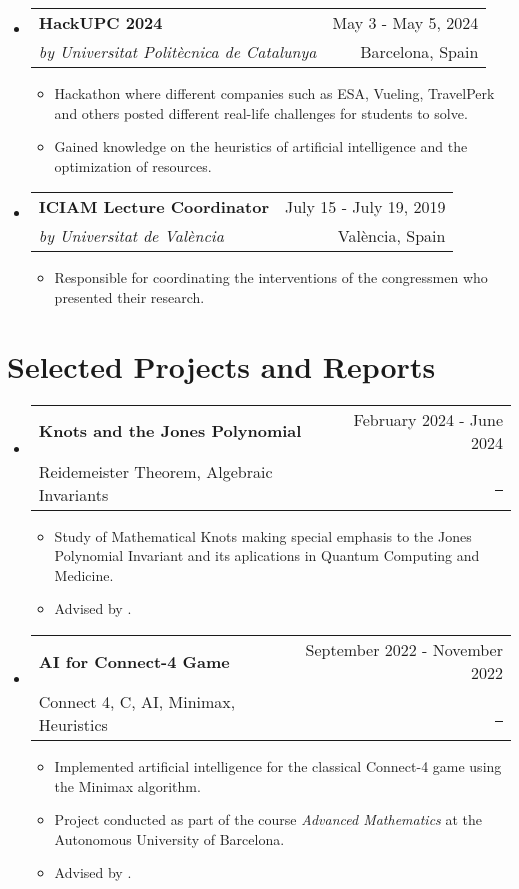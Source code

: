 \documentclass[a4paper,11pt]{article}
\makeatletter
\newcommand{\resumeQuadHeading}[4]{
	\item
	\begin{tabular*}{0.96\textwidth}[t]{l@{\extracolsep{\fill}}r}
		\textbf{#1} & \small #2 \\
		\small#3 & \small #4 \\
	\end{tabular*}
}
\newcommand{\resumeHeadingListStart}{
	\begin{itemize}[leftmargin=0.15in, label={}]
	}
\newcommand{\resumeHeadingListEnd}{\end{itemize}}
\makeatother
\begin{document}
	\resumeHeadingListStart{}
	\resumeQuadHeading{HackUPC 2024}{May 3 - May 5, 2024}{\textit{by Universitat Politècnica de Catalunya}}{Barcelona, Spain}
	\begin{itemize}[leftmargin=3em, itemsep=0.1em, topsep=2pt]
		\item \small Hackathon where different companies such as ESA, Vueling, TravelPerk and others posted different real-life challenges for students to solve.
		\item \small Gained knowledge on the heuristics of artificial intelligence and the optimization of resources.
	\end{itemize}
	\resumeHeadingListEnd{}
	
	\resumeHeadingListStart{}
	\resumeQuadHeading{ICIAM Lecture Coordinator}{July 15 - July 19, 2019}{\textit{by Universitat de València}}{València, Spain}
	\begin{itemize}[leftmargin=3em, itemsep=0.1em, topsep=2pt]
		\item \small Responsible for coordinating the interventions of the congressmen who presented their research.
	\end{itemize}
	\resumeHeadingListEnd{}
	
	
	\section{Selected Projects and Reports}
	\resumeHeadingListStart{}
	\resumeQuadHeading{Knots and the Jones Polynomial}{February 2024 - June 2024}{Reidemeister Theorem, Algebraic Invariants}{\href{https://github.com/Tutusaus/Knot_Theory/blob/master/TFG/main.pdf}{\faFileTextO \ \graydotuline{Report}}}
	\begin{itemize}[leftmargin=3em, itemsep=0.1em, topsep=2pt]
		\item \small Study of Mathematical Knots making special emphasis to the Jones Polynomial Invariant and its aplications in Quantum Computing and Medicine.
		\item \small Advised by \href{https://portalrecerca.uab.cat/en/persons/joan-porti-pique-3}{}.
	\end{itemize}
	\resumeHeadingListEnd{}
	
	\resumeHeadingListStart{}
	\resumeQuadHeading{AI for Connect-4 Game}{September 2022 - November 2022}{Connect 4, C, AI, Minimax, Heuristics}{\href{https://github.com/Tutusaus/4_en_Ratlla}{\faGithub \ \graydotuline{Code}}}
	\begin{itemize}[leftmargin=3em, itemsep=0.1em, topsep=2pt]
		\item \small Implemented artificial intelligence for the classical Connect-4 game using the Minimax algorithm.
		\item \small Project conducted as part of the course \textit{Advanced Mathematics} at the Autonomous University of Barcelona.
		\item \small Advised by \href{https://portalrecerca.uab.cat/en/persons/vicente-soler-ruz}{}.
	\end{itemize}
	\resumeHeadingListEnd{}
	
\end{document}
